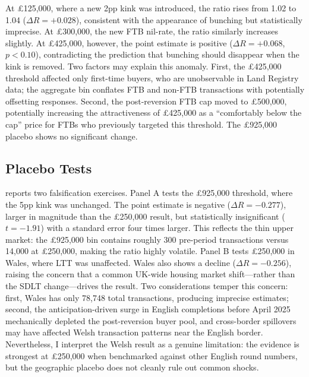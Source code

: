 \documentclass[12pt]{article}
\begin{document}
At \pounds 125,000, where a new 2pp kink was introduced, the ratio rises from 1.02 to 1.04 ($\Delta R = +0.028$), consistent with the appearance of bunching but statistically imprecise. At \pounds 300,000, the new FTB nil-rate, the ratio similarly increases slightly. At \pounds 425,000, however, the point estimate is positive ($\Delta R = +0.068$, $p < 0.10$), contradicting the prediction that bunching should disappear when the kink is removed. Two factors may explain this anomaly. First, the \pounds 425,000 threshold affected only first-time buyers, who are unobservable in Land Registry data; the aggregate bin conflates FTB and non-FTB transactions with potentially offsetting responses. Second, the post-reversion FTB cap moved to \pounds 500,000, potentially increasing the attractiveness of \pounds 425,000 as a ``comfortably below the cap'' price for FTBs who previously targeted this threshold. The \pounds 925,000 placebo shows no significant change.



\subsection{Placebo Tests}

 reports two falsification exercises. Panel A tests the \pounds 925,000 threshold, where the 5pp kink was unchanged. The point estimate is negative ($\Delta R = -0.277$), larger in magnitude than the \pounds 250,000 result, but statistically insignificant ($t = -1.91$) with a standard error four times larger. This reflects the thin upper market: the \pounds 925,000 bin contains roughly 300 pre-period transactions versus 14,000 at \pounds 250,000, making the ratio highly volatile. Panel B tests \pounds 250,000 in Wales, where LTT was unaffected. Wales also shows a decline ($\Delta R = -0.256$), raising the concern that a common UK-wide housing market shift---rather than the SDLT change---drives the result. Two considerations temper this concern: first, Wales has only 78,748 total transactions, producing imprecise estimates; second, the anticipation-driven surge in English completions before April 2025 mechanically depleted the post-reversion buyer pool, and cross-border spillovers may have affected Welsh transaction patterns near the English border. Nevertheless, I interpret the Welsh result as a genuine limitation: the evidence is strongest at \pounds 250,000 when benchmarked against other English round numbers, but the geographic placebo does not cleanly rule out common shocks.
\end{document}
